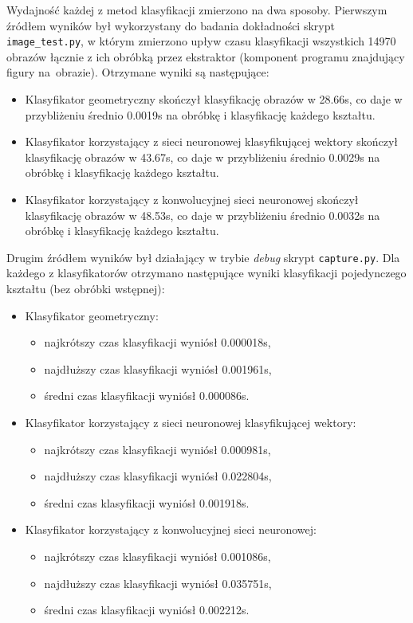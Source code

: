 \documentclass[11pt,a4paper]{article}
\begin{document}
Wydajność każdej z metod klasyfikacji zmierzono na dwa sposoby. Pierwszym źródłem wyników był wykorzystany do badania dokładności skrypt \verb+image_test.py+, w którym zmierzono upływ czasu klasyfikacji wszystkich 14970 obrazów łącznie z ich obróbką przez ekstraktor (komponent programu znajdujący figury na~obrazie). Otrzymane wyniki są następujące:
\begin{itemize}
    \item Klasyfikator geometryczny skończył klasyfikację obrazów w 28.66s, co daje w przybliżeniu średnio 0.0019s na obróbkę i klasyfikację każdego kształtu.
    \item Klasyfikator korzystający z sieci neuronowej klasyfikującej wektory skończył klasyfikację obrazów w 43.67s, co daje w przybliżeniu średnio 0.0029s na obróbkę i klasyfikację każdego kształtu.
    \item Klasyfikator korzystający z konwolucyjnej sieci neuronowej skończył klasyfikację obrazów w 48.53s, co daje w przybliżeniu średnio 0.0032s na obróbkę i klasyfikację każdego kształtu.
\end{itemize}

Drugim źródłem wyników był działający w trybie \emph{debug} skrypt \verb+capture.py+. Dla każdego z klasyfikatorów otrzymano następujące wyniki klasyfikacji pojedynczego kształtu (bez obróbki wstępnej):
\begin{itemize}
    \item Klasyfikator geometryczny:
    \begin{itemize}
        \item najkrótszy czas klasyfikacji wyniósł 0.000018s,
        \item najdłuższy czas klasyfikacji wyniósł 0.001961s,
        \item średni czas klasyfikacji wyniósł 0.000086s.
    \end{itemize}
    \item Klasyfikator korzystający z sieci neuronowej klasyfikującej wektory:
    \begin{itemize}
        \item najkrótszy czas klasyfikacji wyniósł 0.000981s,
        \item najdłuższy czas klasyfikacji wyniósł 0.022804s,
        \item średni czas klasyfikacji wyniósł 0.001918s.
    \end{itemize}
    \item Klasyfikator korzystający z konwolucyjnej sieci neuronowej:
    \begin{itemize}
        \item najkrótszy czas klasyfikacji wyniósł 0.001086s,
        \item najdłuższy czas klasyfikacji wyniósł 0.035751s,
        \item średni czas klasyfikacji wyniósł 0.002212s.
    \end{itemize}
\end{itemize}
\end{document}
